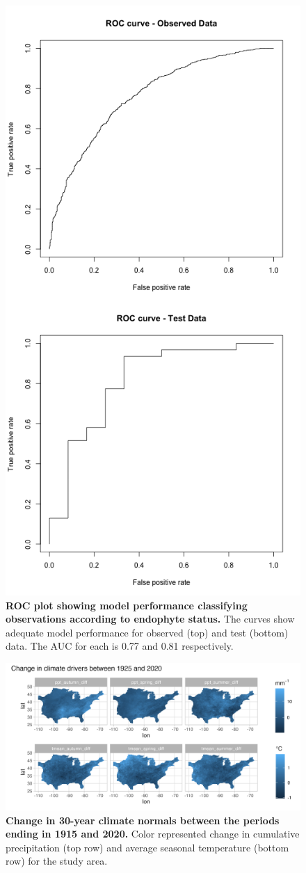 \documentclass[11pt]{article}
\begin{document}
	
	\begin{figure}[H]
		\centering
		\includegraphics[width = .5\linewidth]{ROC_plot.png}
		\caption{\textbf{ROC plot showing model performance classifying observations according to endophyte status.} The curves show adequate model performance for observed (top) and test (bottom) data. The AUC for each is 0.77 and 0.81 respectively.}
	\end{figure}

	\begin{figure}[H]
	\centering
	\includegraphics[width = \linewidth]{climate_change_plot.png}
	\caption{\textbf{Change in 30-year climate normals between the periods ending in 1915 and 2020.} Color represented change in cumulative precipitation (top row) and average seasonal temperature (bottom row) for the study area.}
\end{figure}
\end{document}
